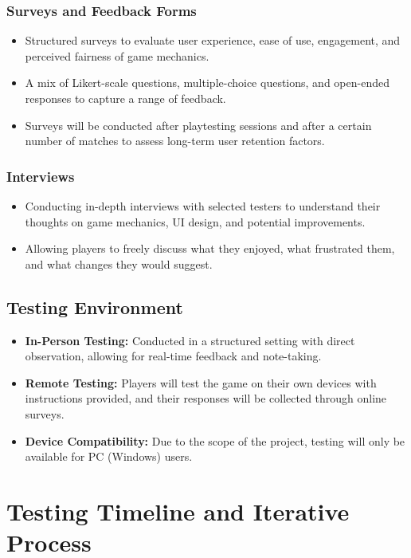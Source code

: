 \documentclass{article}
\begin{document}
\subsubsection{Surveys and Feedback Forms}
\begin{itemize}
    \item Structured surveys to evaluate user experience, ease of use, engagement, and perceived fairness of game mechanics.
    \item A mix of Likert-scale questions, multiple-choice questions, and open-ended responses to capture a range of feedback.
    \item Surveys will be conducted after playtesting sessions and after a certain number of matches to assess long-term user retention factors.
\end{itemize}

\subsubsection{Interviews}
\begin{itemize}
    \item Conducting in-depth interviews with selected testers to understand their thoughts on game mechanics, UI design, and potential improvements.
    \item Allowing players to freely discuss what they enjoyed, what frustrated them, and what changes they would suggest.
\end{itemize}

\subsection{Testing Environment}
\begin{itemize}
    \item \textbf{In-Person Testing:} Conducted in a structured setting with direct observation, allowing for real-time feedback and note-taking.
    \item \textbf{Remote Testing:} Players will test the game on their own devices with instructions provided, and their responses will be collected through online surveys.
    \item \textbf{Device Compatibility:} Due to the scope of the project, testing will only be available for PC (Windows) users.
\end{itemize}

\newpage

\section{Testing Timeline and Iterative Process}
\end{document}
